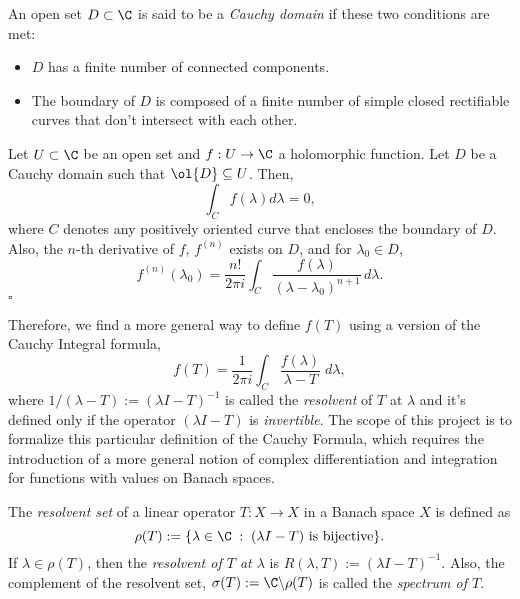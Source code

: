 \begin{definition}\label{def:cauchy_domain}
    An open set $D\subset \C$ is said to be a \textit{Cauchy domain} if these two conditions are met:
    \begin{itemize}
        \item $D$ has a finite number of connected components.
        \item The boundary of $D$ is composed of a finite number of simple closed rectifiable curves that don't intersect with each other.
    \end{itemize}
\end{definition}
\begin{theorem}\label{thm:cauchy_integral_formula_basic} 
    Let $U\subset \C$ be an open set and $f:U\to \C$ a holomorphic function. Let $D$ be a Cauchy domain such that $\ol{D} \subseteq U$. Then,
    \[ \int_{C} f(\lambda) d\lambda = 0, \]
    where $C$ denotes any positively oriented curve that encloses the boundary of $D$. Also, the $n$-th derivative of $f$, $f^{(n)}$ exists on $D$, and for $\lambda_0 \in D$,
    \[ f^{(n)}(\lambda_0) = \frac{n!}{2\pi i} \int_{C} \frac{f(\lambda)}{(\lambda - \lambda_0)^{n+1}} \, d\lambda. \] 
    \hfill $\square$
\end{theorem}

Therefore, we find a more general way to define $f(T)$ using a version of the Cauchy Integral formula,
\[ f(T) = \frac{1}{2\pi i} \int_{C} \frac{f(\lambda)}{\lambda - T} \; d \lambda, \]
where $1/(\lambda - T) := (\lambda I - T)^{-1}$ is called the \textit{resolvent} of $T$ at $\lambda$ and it's defined only if the operator $(\lambda I - T)$ is \textit{invertible}. The scope of this project is to formalize this particular definition of the Cauchy Formula, which requires the introduction of a more general notion of complex differentiation and integration for functions with values on Banach spaces.

\begin{definition}\label{def:resolvent}\label{def:spectrum}
    The \textit{resolvent set} of a linear operator $T: X \to X$ in a Banach space $X$ is defined as
    \[ \rho(T) := \{\lambda \in \C \;:\; (\lambda I - T) \mbox{ is bijective}\}. \]
    If $\lambda \in \rho(T)$, then the \textit{resolvent of $T$ at $\lambda$} is $R(\lambda , T) := (\lambda I - T)^{-1}$. Also, the complement of the resolvent set, $\sigma(T) := \C \backslash \rho(T)$ is called the \textit{spectrum of $T$}.
\end{definition}




